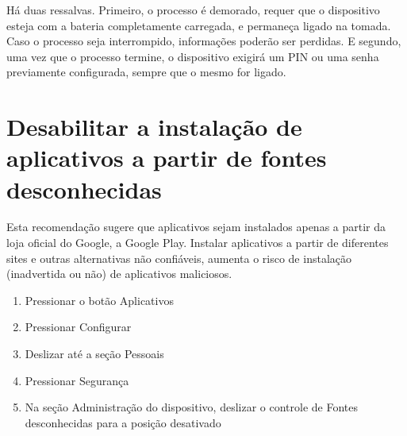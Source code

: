 H\'a duas ressalvas. Primeiro, o processo \'e demorado, requer que o dispositivo esteja com a bateria completamente carregada, e permane\c ca ligado na tomada. Caso o processo seja interrompido, informa\c c\~oes poder\~ao ser perdidas. E segundo, uma vez que o processo termine, o dispositivo exigir\'a um PIN ou uma senha previamente configurada, sempre que o mesmo for ligado.

\section{Desabilitar a instala\c c\~ao de aplicativos a partir de fontes desconhecidas}

Esta recomenda\c c\~ao sugere que aplicativos sejam instalados apenas a partir da loja oficial do Google, a Google Play. Instalar aplicativos a partir de diferentes sites e outras alternativas n\~ao confi\'aveis, aumenta o risco de instala\c c\~ao (inadvertida ou n\~ao) de aplicativos maliciosos.

\begin{enumerate}
\item Pressionar o bot\~ao Aplicativos
\item Pressionar Configurar
\item Deslizar at\'e a se\c c\~ao Pessoais
\item Pressionar Seguran\c ca
\item Na se\c c\~ao Administra\c c\~ao do dispositivo, deslizar o controle de Fontes desconhecidas para a posi\c c\~ao desativado
\end{enumerate}
